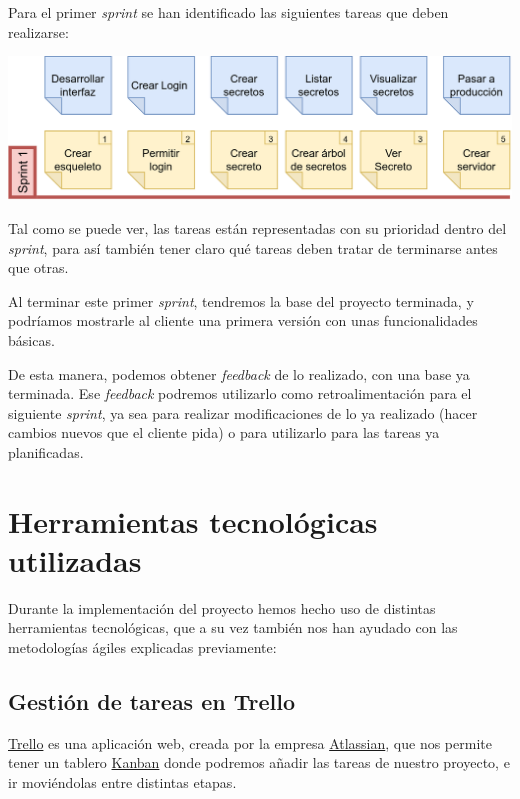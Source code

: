 \documentclass{\ClassPath/viu-tfm-template}
\begin{document}
Para el primer \textit{sprint} se han identificado las siguientes tareas que deben realizarse:

\begin{center}
    \includegraphics[width=\linewidth]{img/sprint1.png}
\end{center}

Tal como se puede ver, las tareas están representadas con su prioridad dentro del \textit{sprint}, para así también tener claro qué tareas deben tratar de terminarse antes que otras.

Al terminar este primer \textit{sprint}, tendremos la base del proyecto terminada, y podríamos mostrarle al cliente una primera versión con unas funcionalidades básicas.

De esta manera, podemos obtener \textit{feedback} de lo realizado, con una base ya terminada. Ese \textit{feedback} podremos utilizarlo como retroalimentación para el siguiente \textit{sprint}, ya sea para realizar modificaciones de lo ya realizado (hacer cambios nuevos que el cliente pida) o para utilizarlo para las tareas ya planificadas.



\section{Herramientas tecnológicas utilizadas}

Durante la implementación del proyecto hemos hecho uso de distintas herramientas tecnológicas, que a su vez también nos han ayudado con las metodologías ágiles explicadas previamente:

\subsection{Gestión de tareas en Trello}

\href{https://trello.com/}{Trello} es una aplicación web, creada por la empresa \href{https://www.atlassian.com/}{Atlassian}, que nos permite tener un tablero \href{https://en.wikipedia.org/wiki/Kanban_(development)}{Kanban} donde podremos añadir las tareas de nuestro proyecto, e ir moviéndolas entre distintas etapas.
\end{document}
